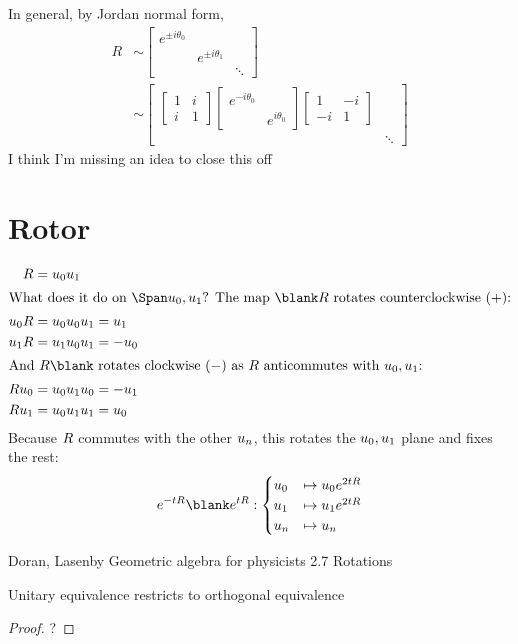 \documentclass{scrartcl}
\begin{document}
\begin{multicols*}{2}
  In general, by Jordan normal form,
  \begin{align*}
    R &\sim
    \begin{bmatrix}
      e^{\pm i \theta_0} \\ &e^{\pm i \theta_1} \\ &&\ddots
    \end{bmatrix} \\
    &\sim
    \begin{bmatrix}
      \begin{bmatrix}
        1 & i \\ i & 1
      \end{bmatrix}
      \begin{bmatrix}
        e^{-i\theta_0} \\ & e^{i\theta_0}
      \end{bmatrix}
      \begin{bmatrix}
        1 & -i \\ -i & 1
      \end{bmatrix}
      \\ & \ddots
    \end{bmatrix}
  \end{align*}
  I think I'm missing an idea to close this off
  \section{Rotor}
  \begin{align*}
    \R&=\b_0\b_1 \\
    \intertext{What does it do on \(\Span \b_0,\b_1\)?  The map \(\blank \R\) rotates counterclockwise (\(+\)):}
    \b_0\R &= \b_0\b_0\b_1 = \b_1  \\
    \b_1\R &= \b_1\b_0\b_1 = -\b_0 \\
    \intertext{And \(R\blank\) rotates clockwise (\(-\)) as \(\R\) anticommutes with \(\b_0,\b_1\):}
    \R\b_0 &= \b_0\b_1\b_0 = -\b_1 \\
    \R\b_1 &= \b_0\b_1\b_1 = \b_0
  \end{align*}
  Because \(R\) commutes with the other \(u_n\), this rotates the \(u_0,u_1\) plane and fixes the rest:
  \[
    e^{-t\R} \blank e^{t\R}:
    \begin{cases}
      \b_0 &\mapsto \b_0 e^{2t\R} \\
      \b_1 &\mapsto \b_1 e^{2t\R} \\
      \b_n &\mapsto \b_n
    \end{cases}
  \]

  Doran, Lasenby Geometric algebra for physicists 2.7 Rotations

  \begin{lemma}
    Unitary equivalence restricts to orthogonal equivalence
  \end{lemma}
  \begin{proof}
    ?
  \end{proof}

\end{multicols*}
\end{document}
